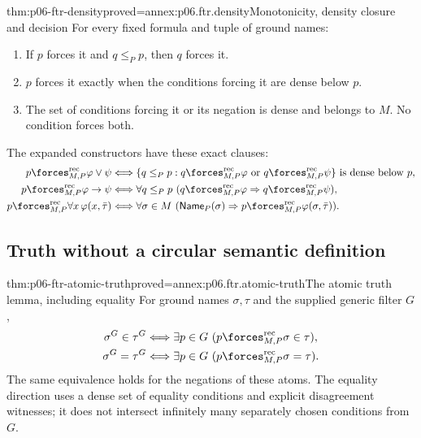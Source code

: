 \begin{hbtheorem}{thm:p06-ftr-density}{proved=annex:p06.ftr.density}{Monotonicity, density closure and decision}
For every fixed formula and tuple of ground names:
\begin{enumerate}
\item If \(p\) forces it and \(q\leq_P p\), then \(q\) forces it.
\item \(p\) forces it exactly when the conditions forcing it are dense below \(p\).
\item The set of conditions forcing it or its negation is dense and belongs
      to \(M\). No condition forces both.
\end{enumerate}
The expanded constructors have these exact clauses:
\[
\begin{aligned}
 p\forces^{\mathrm{rec}}_{M,P}\varphi\lor\psi
 &\Longleftrightarrow
   \{q\leq_P p:q\forces^{\mathrm{rec}}_{M,P}\varphi
                  \text{ or }q\forces^{\mathrm{rec}}_{M,P}\psi\}
                 \text{ is dense below }p,\\
 p\forces^{\mathrm{rec}}_{M,P}\varphi\to\psi
 &\Longleftrightarrow
   \forall q\leq_P p\ (q\forces^{\mathrm{rec}}_{M,P}\varphi
                  \Rightarrow q\forces^{\mathrm{rec}}_{M,P}\psi),\\
 p\forces^{\mathrm{rec}}_{M,P}\forall x\,\varphi(x,\bar\tau)
 &\Longleftrightarrow
   \forall\sigma\in M\ (\mathsf{Name}_P(\sigma)
        \Rightarrow p\forces^{\mathrm{rec}}_{M,P}\varphi(\sigma,\bar\tau)).
\end{aligned}
\]
\end{hbtheorem}

\subsection{Truth without a circular semantic definition}

\begin{hblemma}{thm:p06-ftr-atomic-truth}{proved=annex:p06.ftr.atomic-truth}{The atomic truth lemma, including equality}
For ground names \(\sigma,\tau\) and the supplied generic filter \(G\),
\[
\begin{aligned}
 \sigma^G\in\tau^G
 &\Longleftrightarrow\exists p\in G\
       (p\forces^{\mathrm{rec}}_{M,P}\sigma\in\tau),\\
 \sigma^G=\tau^G
 &\Longleftrightarrow\exists p\in G\
       (p\forces^{\mathrm{rec}}_{M,P}\sigma=\tau).
\end{aligned}
\]
The same equivalence holds for the negations of these atoms. The equality
direction uses a dense set of equality conditions and explicit disagreement
witnesses; it does not intersect infinitely many separately chosen conditions
from \(G\).
\end{hblemma}

